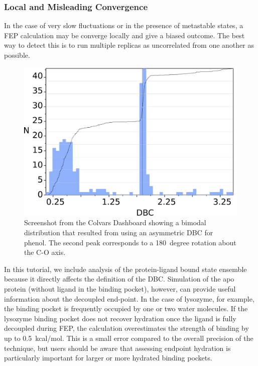 \documentclass[9pt,tutorial]{Styling/livecoms}
\begin{document}
\subsubsection{Local and Misleading Convergence}
In the case of very slow fluctuations or in the presence of metastable states, a FEP calculation may be converge locally and give a biased outcome.
The best way to detect this is to run multiple replicas as uncorrelated from one another as possible. 
\begin{figure}[!htb]
    \centering
    \includegraphics[width=0.9\linewidth]{bimodal_distribution.png}
    \caption{Screenshot from the Colvars Dashboard showing a bimodal distribution that resulted from using an asymmetric DBC for phenol. The second peak corresponds to a 180~degree rotation about the C-O axis.}
    \label{fig:bimodalDBC}
\end{figure}
In this tutorial, we include analysis of the protein-ligand bound state ensemble because it directly affects the definition of the DBC.
Simulation of the apo protein (without ligand in the binding pocket), however, can provide useful information about the decoupled end-point.
In the case of lysozyme, for example, the binding pocket is frequently occupied by one or two water molecules.
If the lysozyme binding pocket does not recover hydration once the ligand is fully decoupled during FEP, the calculation overestimates the strength of binding by up to 0.5~kcal/mol. This is a small error compared to the overall precision of the technique, but users should be aware that assessing endpoint hydration is particularly important for larger or more hydrated binding pockets. 
\end{document}
